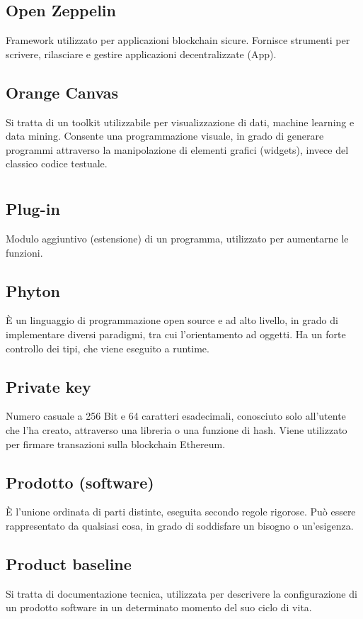 	\subsection*{Open Zeppelin}
	Framework utilizzato per applicazioni blockchain sicure. Fornisce strumenti per scrivere, rilasciare e gestire applicazioni decentralizzate (\DJ{}App).
	\subsection*{Orange Canvas}
	Si tratta di un toolkit utilizzabile per visualizzazione di dati, machine learning e data mining. Consente una programmazione visuale, in grado di generare programmi attraverso la manipolazione di elementi grafici (widgets), invece del classico codice testuale.
\pagebreak
\section[P]{}
	\subsection*{Plug-in}
	Modulo aggiuntivo (estensione) di un programma, utilizzato per aumentarne le funzioni.
	\subsection*{Phyton}
	È un linguaggio di programmazione open source e ad alto livello, in grado di implementare diversi paradigmi, tra cui l’orientamento ad oggetti. Ha un forte controllo dei tipi, che viene eseguito a runtime.
	\subsection*{Private key}
	Numero casuale a 256 Bit e 64 caratteri esadecimali, conosciuto solo all’utente che l’ha creato, attraverso una libreria o una funzione di hash. Viene utilizzato per firmare transazioni sulla blockchain Ethereum.
	\subsection*{Prodotto (software)}
	È l’unione ordinata di parti distinte, eseguita secondo regole rigorose. Può essere rappresentato da qualsiasi cosa, in grado di soddisfare un bisogno o un’esigenza.
	\subsection*{Product baseline}
	Si tratta di documentazione tecnica, utilizzata per descrivere la configurazione di un prodotto software in un determinato momento del suo ciclo di vita.
